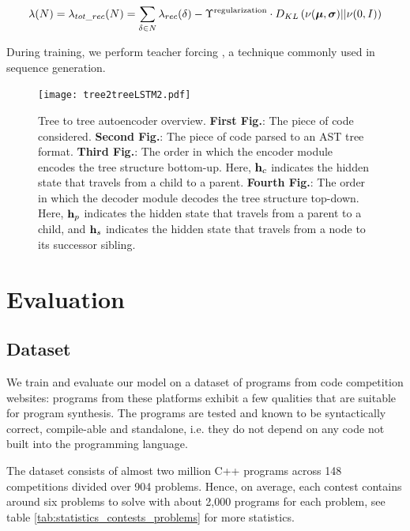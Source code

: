 \begin{align}
    \lambda(N) = \lambda_{tot\_rec}(N) = \sum_{\delta \in N}\lambda_{rec}(\delta) - \Upsilon^\text{regularization} \cdot D_{KL}\left(\nu(\boldsymbol\mu,\boldsymbol\sigma)||\nu(0,I)\right)
\end{align}

During training, we perform teacher forcing \cite[section 11.6.6]{kolenFieldGuideDynamical2001}, a technique commonly used in sequence generation.

\begin{figure}
    \centering
    \texttt{[image: tree2treeLSTM2.pdf]}
    \caption[Tree2Tree model high-level overview]{Tree to tree autoencoder overview. \textbf{First Fig.}: The piece of code considered. \textbf{Second Fig.}: The piece of code parsed to an AST tree format. \textbf{Third Fig.}: The order in which the encoder module encodes the tree structure bottom-up. Here, $\mathbf{h}_c$ indicates the hidden state that travels from a child to a parent. \textbf{Fourth Fig.}: The order in which the decoder module decodes the tree structure top-down. Here, $\mathbf{h}_p$ indicates the hidden state that travels from a parent to a child, and $\mathbf{h}_s$ indicates the hidden state that travels from a node to its successor sibling.}
    \label{fig:tree2treeVAE}
\end{figure}

\newpage
\section{Evaluation}
\label{sec:tree2tree-eval}

\subsection{Dataset}
\label{sec:tree2tree-dataset}
We train and evaluate our model on a dataset of programs from code competition websites: programs from these platforms exhibit a few qualities that are suitable for program synthesis. The programs are tested and known to be syntactically correct, compile-able and standalone, i.e. they do not depend on any code not built into the programming language. 

The dataset consists of almost two million C++ programs across 148 competitions divided over 904 problems. 
Hence, on average, each contest contains around six problems to solve with about 2,000 programs for each problem, see table \ref{tab:statistics_contests_problems} for more statistics. 

